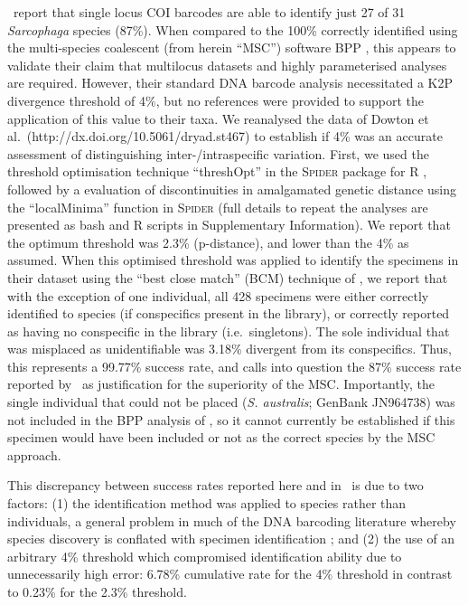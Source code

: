 \documentclass[12pt]{article}
\begin{document}
\citeauthor{Dowton2014}\ report that single locus COI barcodes are able to identify just 27 of 31 \emph{Sarcophaga} species (87\%). When compared to the 100\% correctly identified using the multi-species coalescent (from herein ``MSC'') software BPP \citep{Yang2010}, this appears to validate their claim that multilocus datasets and highly parameterised analyses are required. However, their standard DNA barcode analysis necessitated a K2P divergence threshold of 4\%, but no references were provided to support the application of this value to their taxa. We reanalysed the data of Dowton et al.\ (http://dx.doi.org/10.5061/dryad.st467) to establish if 4\% was an accurate assessment of distinguishing inter-/intraspecific variation. First, we used the threshold optimisation technique ``threshOpt'' in the \textsc{Spider} package for R \citep{Brown2012}, followed by a evaluation of discontinuities in amalgamated genetic distance using the ``localMinima'' function in \textsc{Spider} (full details to repeat the analyses are presented as bash and R scripts in Supplementary Information). We report that the optimum threshold was 2.3\% (p-distance), and lower than the 4\% as assumed. When this optimised threshold was applied to identify the specimens in their dataset using the ``best close match'' (BCM) technique of \citep{Meier2006}, we report that with the exception of one individual, all 428 specimens were either correctly identified to species (if conspecifics present in the library), or correctly reported as having no conspecific in the library (i.e.\ singletons). The sole individual that was misplaced as unidentifiable was 3.18\% divergent from its conspecifics. Thus, this represents a 99.77\% success rate, and calls into question the 87\% success rate reported by \citeauthor{Dowton2014}\ as justification for the superiority of the MSC. Importantly, the single individual that could not be placed (\emph{S. australis}; GenBank JN964738) was not included in the BPP analysis of \citeauthor{Dowton2014}, so it cannot currently be established if this specimen would have been included or not as the correct species by the MSC approach. 

This discrepancy between success rates reported here and in \citeauthor{Dowton2014}\ is due to two factors: (1) the identification method was applied to species rather than individuals, a general problem in much of the DNA barcoding literature whereby species discovery is conflated with specimen identification \citep{Collins2012}; and (2) the use of an arbitrary 4\% threshold which compromised identification ability due to unnecessarily high error: 6.78\% cumulative rate for the 4\% threshold in contrast to 0.23\% for the 2.3\% threshold. 
\end{document}
